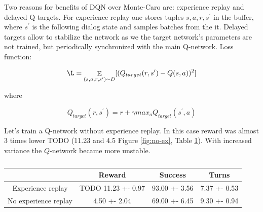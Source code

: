 \documentclass[12pt,titlepage,a4paper]{article}
\DeclareMathOperator*{\E}{\mathbb{E}}
\begin{document}
Two reasons for benefits of DQN over Monte-Caro are: experience replay and delayed Q-targets. For experience replay one stores tuples ${s, a, r, s^\prime}$ in the buffer, where $s^\prime$ is the following dialog state and samples batches from the it. Delayed targets allow to stabilize the network as we the target network’s parameters are not trained, but periodically synchronized with the main Q-network. Loss function:

\[\L = \E_{(s, a, r, s^\prime) \sim D} [(Q_{target}(r,s^\prime) - Q(s, a))^2]\]

where 

\[Q_{target}(r, s^\prime) = r + \gamma max_{a}Q_{target}(s^\prime,a)\]

Let's train a Q-network without experience replay. In this case reward was almost 3 times lower TODO (11.23 and 4.5 Figure \ref{fig:no-ex}, Table \ref{tab:replay-no-replay}). With increased variance the $Q$-network became more unstable.
\begin{table}[!h]
    \centering
    \begin{tabular}{||c c c c||} 
     \hline
      & Reward & Success & Turns \\ [0.5ex] 
     \hline\hline
     Experience replay & TODO 11.23 +- 0.97 & 93.00 +- 3.56 & 7.37 +- 0.53 \\ 
     \hline
     No experience replay & 4.50 +- 2.04 & 69.00 +- 6.45 & 9.30 +- 0.94 \\
     \hline
    \end{tabular}
    \caption{}
    \label{tab:replay-no-replay}
\end{table}
\end{document}
